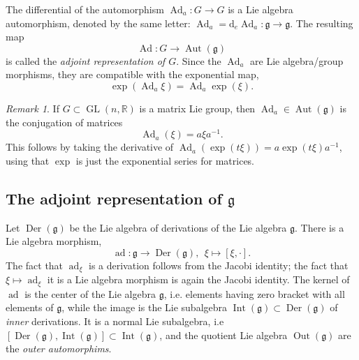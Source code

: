 \documentclass{article}
\theoremstyle{remark}
\newtheorem{remark}[theorem]{Remark}
\newcommand{\R}{\mathbb{R}}
\newcommand\lie[1]{\mathfrak{#1}}
\newcommand{\g}{\lie{g}}
\newcommand{\on}{\operatorname}
\newcommand{\Ad}{ \on{Ad} }
\newcommand{\ad}{ \on{ad} }
\newcommand{\GL}{ \on{GL}}
\renewcommand{\d}{{\mbox{d}}}
\begin{document}
The differential of the automorphism $\Ad_a\colon G\to G$ is a Lie algebra automorphism, 
denoted by the same letter: $\Ad_a=\d_e\Ad_a\colon\g\to \g$. 
The resulting map 
\[ \Ad\colon G\to \on{Aut}(\g)\] 
is called the \emph{adjoint representation of $G$}.
%
Since the $\Ad_a$ are Lie algebra/group morphisms, they are 
compatible with the exponential map, 
%
\[ \exp(\Ad_a\xi)=\Ad_a\exp(\xi).\]
%
 
\begin{remark}
If $G\subset \GL(n,\R)$ is a matrix Lie group, then 
$\Ad_a\in \on{Aut}(\g)$ is the conjugation of matrices
%
\[ \Ad_a(\xi)= a\xi a^{-1}.\] 
%
This follows by taking the derivative of $\Ad_a(\exp(t\xi))=a\exp(t\xi)a^{-1}$, using that $\exp$ is just the exponential series for matrices. 
\end{remark}



\subsection{The adjoint representation of $\g$}
%
Let $\on{Der}(\g)$ be the Lie algebra of derivations of the Lie algebra $\g$. 
There is a Lie algebra morphism, 
\[ \ad\colon \g\to \on{Der}(\g),\ \ \xi\mapsto [\xi,\cdot].\]
%
The fact that $\ad_\xi$ is a derivation follows from the Jacobi identity; 
the fact that $\xi\mapsto \ad_\xi$ it is a Lie algebra morphism is again the 
Jacobi identity. 
The kernel of $\ad$ is the center of the Lie algebra $\g$, i.e. elements 
having zero bracket with all elements of $\g$, while the image is the 
Lie subalgebra $\on{Int}(\g)\subset \on{Der}(\g)$ of \emph{inner} derivations. 
It is a normal Lie subalgebra, i.e $[\on{Der}(\g),\on{Int}(\g)]\subset \on{Int}(\g)$, and the quotient Lie algebra $\on{Out}(\g)$ are the 
\emph{outer automorphims}. 
\end{document}
